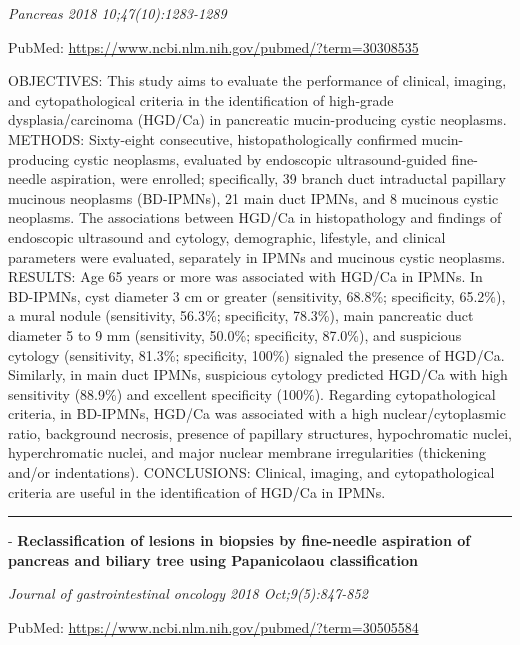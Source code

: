 \documentclass[]{article}
\begin{document}
\emph{Pancreas 2018 10;47(10):1283-1289}

PubMed: \url{https://www.ncbi.nlm.nih.gov/pubmed/?term=30308535}

OBJECTIVES: This study aims to evaluate the performance of clinical,
imaging, and cytopathological criteria in the identification of
high-grade dysplasia/carcinoma (HGD/Ca) in pancreatic mucin-producing
cystic neoplasms. METHODS: Sixty-eight consecutive, histopathologically
confirmed mucin-producing cystic neoplasms, evaluated by endoscopic
ultrasound-guided fine-needle aspiration, were enrolled; specifically,
39 branch duct intraductal papillary mucinous neoplasms (BD-IPMNs), 21
main duct IPMNs, and 8 mucinous cystic neoplasms. The associations
between HGD/Ca in histopathology and findings of endoscopic ultrasound
and cytology, demographic, lifestyle, and clinical parameters were
evaluated, separately in IPMNs and mucinous cystic neoplasms. RESULTS:
Age 65 years or more was associated with HGD/Ca in IPMNs. In BD-IPMNs,
cyst diameter 3 cm or greater (sensitivity, 68.8\%; specificity,
65.2\%), a mural nodule (sensitivity, 56.3\%; specificity, 78.3\%), main
pancreatic duct diameter 5 to 9 mm (sensitivity, 50.0\%; specificity,
87.0\%), and suspicious cytology (sensitivity, 81.3\%; specificity,
100\%) signaled the presence of HGD/Ca. Similarly, in main duct IPMNs,
suspicious cytology predicted HGD/Ca with high sensitivity (88.9\%) and
excellent specificity (100\%). Regarding cytopathological criteria, in
BD-IPMNs, HGD/Ca was associated with a high nuclear/cytoplasmic ratio,
background necrosis, presence of papillary structures, hypochromatic
nuclei, hyperchromatic nuclei, and major nuclear membrane irregularities
(thickening and/or indentations). CONCLUSIONS: Clinical, imaging, and
cytopathological criteria are useful in the identification of HGD/Ca in
IPMNs.

{}

{}

\begin{center}\rule{0.5\linewidth}{\linethickness}\end{center}

 - \textbf{Reclassification of lesions in biopsies by fine-needle
aspiration of pancreas and biliary tree using Papanicolaou
classification}

\emph{Journal of gastrointestinal oncology 2018 Oct;9(5):847-852}

PubMed: \url{https://www.ncbi.nlm.nih.gov/pubmed/?term=30505584}
\end{document}
